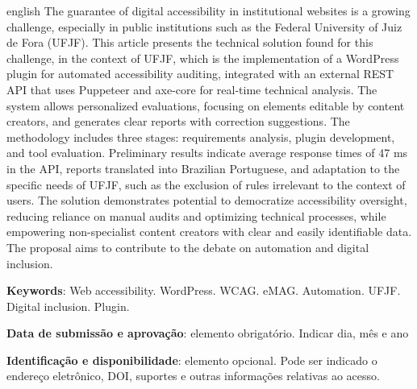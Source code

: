 \documentclass[
	article,			%
	12pt,				%
	oneside,			%
	a4paper,			%
	section=TITLE,		%
	subsection=TITLE,	%
	english,			%
	brazil,				%
	sumario=tradicional
	]{abntex2}
\begin{document}
\renewcommand{\resumoname}{Abstract}
\begin{resumoumacoluna}
    \begin{otherlanguage*}{english}
        The guarantee of digital accessibility in institutional websites is a
        growing challenge, especially in public institutions such as the Federal
        University of Juiz de Fora (UFJF). This article presents the technical
        solution found for this challenge, in the context of UFJF, which is the
        implementation of a WordPress plugin for automated accessibility auditing,
        integrated with an external REST API that uses Puppeteer and axe-core for
        real-time technical analysis. The system allows personalized evaluations,
        focusing on elements editable by content creators, and generates clear
        reports with correction suggestions. The methodology includes three stages:
        requirements analysis, plugin development, and tool evaluation. Preliminary
        results indicate average response times of 47 ms in the API, reports
        translated into Brazilian Portuguese, and adaptation to the specific
        needs of UFJF, such as the exclusion of rules irrelevant to the context of
        users. The solution demonstrates potential to democratize accessibility
        oversight, reducing reliance on manual audits and optimizing technical
        processes, while empowering non-specialist content creators with clear and
        easily identifiable data. The proposal aims to contribute to the debate on
        automation and digital inclusion.

        \vspace{\onelineskip}

        \noindent
        \textbf{Keywords}: Web accessibility. WordPress. WCAG. eMAG. Automation. UFJF. Digital inclusion. Plugin.
    \end{otherlanguage*}
\end{resumoumacoluna}


\begin{center}\smaller
    \textbf{Data de submissão e aprovação}: elemento obrigatório. Indicar dia, mês e ano

    \textbf{Identificação e disponibilidade}: elemento opcional. Pode ser indicado
    o endereço eletrônico, DOI, suportes e outras informações relativas ao acesso.
\end{center}
\end{document}
